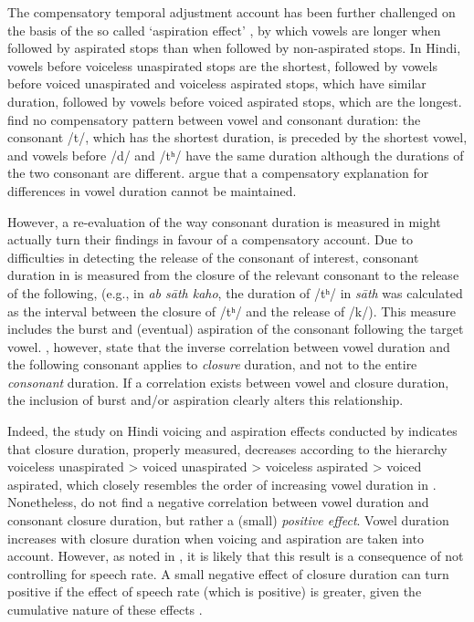 \documentclass[preprint]{JASAnew}
\begin{document}
The compensatory temporal adjustment account has been further challenged
on the basis of the so called `aspiration effect' \citep{maddieson1976},
by which vowels are longer when followed by aspirated stops than when
followed by non-aspirated stops. In Hindi, vowels before voiceless
unaspirated stops are the shortest, followed by vowels before voiced
unaspirated and voiceless aspirated stops, which have similar duration,
followed by vowels before voiced aspirated stops, which are the longest.
\citet{maddieson1976} find no compensatory pattern between vowel and
consonant duration: the consonant /t/, which has the shortest duration,
is preceded by the shortest vowel, and vowels before /d/ and /tʰ/ have
the same duration although the durations of the two consonant are
different. \citet{maddieson1976} argue that a compensatory explanation
for differences in vowel duration cannot be maintained.

However, a re-evaluation of the way consonant duration is measured in
\citet{maddieson1976} might actually turn their findings in favour of a
compensatory account. Due to difficulties in detecting the release of
the consonant of interest, consonant duration in \citet{maddieson1976}
is measured from the closure of the relevant consonant to the release of
the following, (e.g., in \emph{ab sāth kaho}, the duration of /tʰ/ in
\emph{sāth} was calculated as the interval between the closure of /tʰ/
and the release of /k/). This measure includes the burst and (eventual)
aspiration of the consonant following the target vowel.
\citet{slis1969a}, however, state that the inverse correlation between
vowel duration and the following consonant applies to \emph{closure}
duration, and not to the entire \emph{consonant} duration. If a
correlation exists between vowel and closure duration, the inclusion of
burst and/or aspiration clearly alters this relationship.

Indeed, the study on Hindi voicing and aspiration effects conducted by
\citet{durvasula2012} indicates that closure duration, properly
measured, decreases according to the hierarchy voiceless unaspirated
\textgreater{} voiced unaspirated \textgreater{} voiceless aspirated
\textgreater{} voiced aspirated, which closely resembles the order of
increasing vowel duration in \citet{maddieson1976}. Nonetheless,
\citet{durvasula2012} do not find a negative correlation between vowel
duration and consonant closure duration, but rather a (small)
\emph{positive effect}. Vowel duration increases with closure duration
when voicing and aspiration are taken into account. However, as noted in
\citet{begus2017}, it is likely that this result is a consequence of not
controlling for speech rate. A small negative effect of closure duration
can turn positive if the effect of speech rate (which is positive) is
greater, given the cumulative nature of these effects
\citep[p. 2177]{begus2017}.
\end{document}
